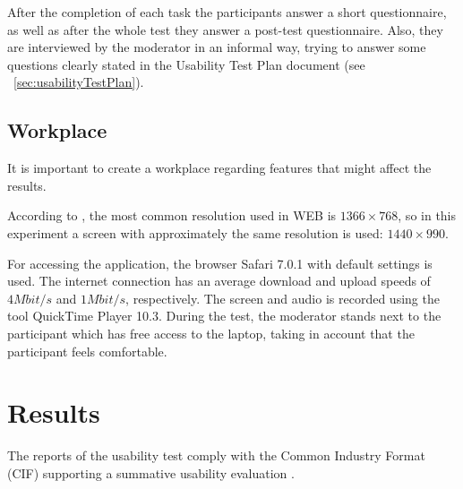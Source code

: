 \documentclass[a4paper]{article}
\begin{document}
 After the completion of each task the participants answer a short questionnaire, as well as after the whole test they answer a post-test questionnaire. Also, they are interviewed by the moderator in an informal way, trying to answer some questions clearly stated in the Usability Test Plan document (see ~\ref{sec:usabilityTestPlan}). 



\subsection{Workplace}
It is important to create a workplace regarding features that might affect the results.

According to \citep{http://www.satya-weblog.com/2013/07/desktop-laptop-mobile-screen-resolution-most-common-worldwide.html}, the most common resolution used in WEB is $1366\times 768$, so in this experiment a screen with approximately the same resolution is used: $1440\times 990$.

For accessing the application, the browser Safari 7.0.1 with default settings is used. The internet connection has an average download and upload speeds of $4 Mbit/s$ and $1Mbit/s$, respectively. The screen and audio is recorded using the tool QuickTime Player 10.3. During the test, the moderator stands next to the participant which has free access to the laptop, taking in account that the participant feels comfortable.



\section{Results}
The reports of the usability test comply with the Common Industry Format (CIF) supporting a summative usability evaluation \citep{iusr2006cif}.

\appendix












\end{document}

